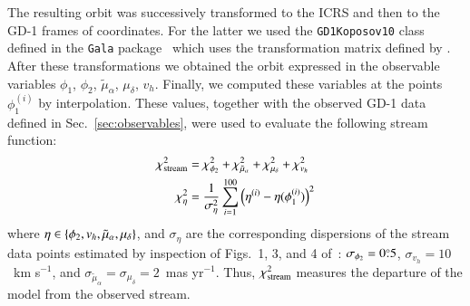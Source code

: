 \documentclass[twocolumn]{aa}
\begin{document}
The resulting orbit was successively transformed to the ICRS and then to the GD-1 frames of coordinates. For the latter we used the \texttt{GD1Koposov10} class defined in the \texttt{Gala} package~\citep{gala,adrian_price_whelan_2020_4159870} which uses the transformation matrix defined by \citet{Koposov_2010}.
After these transformations we obtained the orbit expressed in the observable variables $\phi_1$, $\phi_2$, $\tilde{\mu}_\alpha$, $\mu_\delta$, $v_h$. Finally, we computed these variables at the points $\phi_1^{(i)}$ by interpolation. These values, together with the observed GD-1 data defined in Sec.~\ref{sec:observables}, were used to evaluate the following stream function:
\begin{align}
   \label{chi2:stream}
   \chi^2_{\rm{stream}} &= \chi^2_{\phi_2} + \chi^2_{\tilde{\mu}_\alpha}+ \chi^2_{\mu_\delta}+\chi^2_{v_h}\\
   \label{chi2:component}
   \chi^2_{\eta} &= \frac{1}{\sigma_\eta^2}\sum_{i=1}^{100} \left(\eta^{(i)}-\eta(\phi_1^{(i)})\right)^2
\end{align}
where
$\eta\in\left\{\phi_2, v_h, \tilde{\mu}_\alpha, \mu_\delta\right\}$, and $\sigma_\eta$ are the corresponding dispersions of the stream data points estimated by inspection of Figs.~1, 3, and 4 of~\citet{Ibata_2020}:
$\sigma_{\phi_2}=0\overset{\circ}{.} 5$,
$\sigma_{v_h} = 10$~km s$^{-1}$, and
$\sigma_{\tilde{\mu}_\alpha}= \sigma_{\mu_\delta}= 2$~mas yr$^{-1}$.
Thus, $\chi^2_{\rm{stream}}$ measures the departure of the model from the observed stream.
\end{document}
